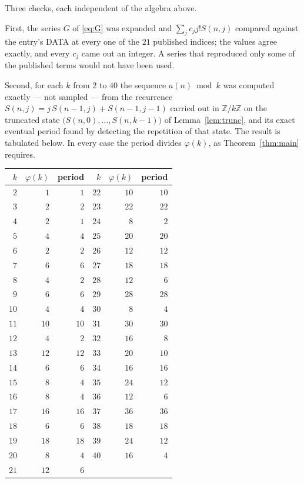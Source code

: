 \documentclass[11pt,a4paper]{article}
\theoremstyle{plain}
\theoremstyle{definition}
\begin{document}
Three checks, each independent of the algebra above.

First, the series $G$ of \eqref{eq:G} was expanded and $\sum_j c_j j! S(n,j)$ compared
against the entry's DATA at every one of the $21$ published indices; the values
agree exactly, and every $c_j$ came out an integer. A series that reproduced only some of
the published terms would not have been used.

Second, for each $k$ from $2$ to $40$ the sequence $a(n)\bmod k$ was computed exactly
--- not sampled --- from the recurrence $S(n,j)=j\,S(n-1,j)+S(n-1,j-1)$ carried out in
$\mathbb{Z}/k\mathbb{Z}$ on the truncated state
$\bigl(S(n,0),\dots,S(n,k-1)\bigr)$ of Lemma~\ref{lem:trunc}, and its exact eventual
period found by detecting the repetition of that state. The result is tabulated below.
In every case the period divides $\varphi(k)$, as Theorem~\ref{thm:main} requires.

\begin{center}\small
\begin{tabular}{rrr@{\qquad\qquad}rrr}
$k$ & $\varphi(k)$ & period & $k$ & $\varphi(k)$ & period \\ \hline
$2$ & $1$ & $1$ & $22$ & $10$ & $10$ \\
$3$ & $2$ & $2$ & $23$ & $22$ & $22$ \\
$4$ & $2$ & $1$ & $24$ & $8$ & $2$ \\
$5$ & $4$ & $4$ & $25$ & $20$ & $20$ \\
$6$ & $2$ & $2$ & $26$ & $12$ & $12$ \\
$7$ & $6$ & $6$ & $27$ & $18$ & $18$ \\
$8$ & $4$ & $2$ & $28$ & $12$ & $6$ \\
$9$ & $6$ & $6$ & $29$ & $28$ & $28$ \\
$10$ & $4$ & $4$ & $30$ & $8$ & $4$ \\
$11$ & $10$ & $10$ & $31$ & $30$ & $30$ \\
$12$ & $4$ & $2$ & $32$ & $16$ & $8$ \\
$13$ & $12$ & $12$ & $33$ & $20$ & $10$ \\
$14$ & $6$ & $6$ & $34$ & $16$ & $16$ \\
$15$ & $8$ & $4$ & $35$ & $24$ & $12$ \\
$16$ & $8$ & $4$ & $36$ & $12$ & $6$ \\
$17$ & $16$ & $16$ & $37$ & $36$ & $36$ \\
$18$ & $6$ & $6$ & $38$ & $18$ & $18$ \\
$19$ & $18$ & $18$ & $39$ & $24$ & $12$ \\
$20$ & $8$ & $4$ & $40$ & $16$ & $4$ \\
$21$ & $12$ & $6$ &  & & \\
\end{tabular}
\end{center}
\end{document}
